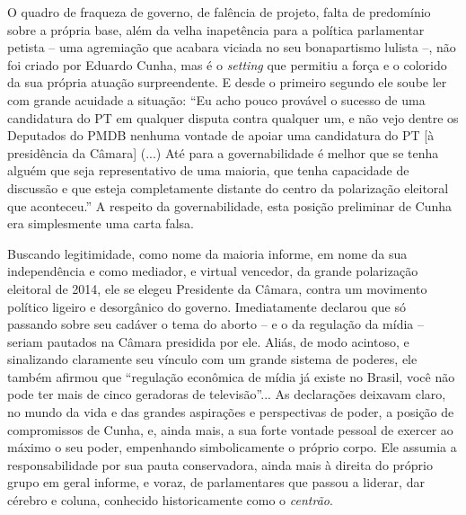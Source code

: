 O quadro de fraqueza de governo, de falência de projeto, falta de
predomínio sobre a própria base, além da velha inapetência para a
política parlamentar petista -- uma agremiação que acabara viciada no
seu bonapartismo lulista --, não foi criado por Eduardo Cunha, mas é o
\emph{setting} que permitiu a força e o colorido da sua própria atuação
surpreendente. E desde o primeiro segundo ele soube ler com grande
acuidade a situação: ``Eu acho pouco provável o sucesso de uma
candidatura do PT em qualquer disputa contra qualquer um, e não vejo
dentre os Deputados do PMDB nenhuma vontade de apoiar uma candidatura do
PT {[}à presidência da Câmara{]} (...) Até para a governabilidade é
melhor que se tenha alguém que seja representativo de uma maioria, que
tenha capacidade de discussão e que esteja completamente distante do
centro da polarização eleitoral que aconteceu.'' A respeito da
governabilidade, esta posição preliminar de Cunha era simplesmente uma
carta falsa.

Buscando legitimidade, como nome da maioria informe, em nome da sua
independência e como mediador, e virtual vencedor, da grande polarização
eleitoral de 2014, ele se elegeu Presidente da Câmara, contra um
movimento político ligeiro e desorgânico do governo. Imediatamente
declarou que só passando sobre seu cadáver o tema do aborto -- e o da
regulação da mídia -- seriam pautados na Câmara presidida por ele.
Aliás, de modo acintoso, e sinalizando claramente seu vínculo com um
grande sistema de poderes, ele também afirmou que ``regulação econômica
de mídia já existe no Brasil, você não pode ter mais de cinco geradoras
de televisão''... As declarações deixavam claro, no mundo da vida e das
grandes aspirações e perspectivas de poder, a posição de compromissos de
Cunha, e, ainda mais, a sua forte vontade pessoal de exercer ao máximo o
seu poder, empenhando simbolicamente o próprio corpo. Ele assumia a
responsabilidade por sua pauta conservadora, ainda mais à direita do
próprio grupo em geral informe, e voraz, de parlamentares que passou a
liderar, dar cérebro e coluna, conhecido historicamente como o
\emph{centrão}.

